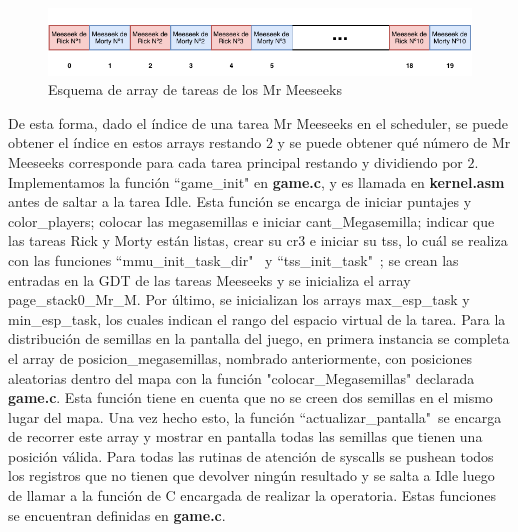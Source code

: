 \documentclass[a4paper]{article}
\begin{document}
\begin{figure}[h]
	\centering
	\includegraphics[scale=0.9]{img/TareasSinRickyMorty.pdf}
	\caption{Esquema de array de tareas de los Mr Meeseeks}
\end{figure}

\justify
De esta forma, dado el índice de una tarea Mr Meeseeks en el scheduler, se puede obtener el índice en estos arrays restando $2$ y se puede obtener qué número de Mr Meeseeks corresponde para cada tarea principal restando y dividiendo por $2$.
\justify
Implementamos la función ``game_init" en \textbf{game.c}, y es llamada en \textbf{kernel.asm} antes de saltar a la tarea Idle. Esta función se encarga de iniciar puntajes y color_players; colocar las megasemillas e iniciar cant_Megasemilla; indicar que las tareas Rick y Morty están listas, crear su cr3 e iniciar su tss, lo cuál se realiza con las funciones ``mmu_init_task_dir" \ y ``tss_init_task"\ ; se crean las entradas en la GDT de las tareas Meeseeks y se inicializa el array page_stack0_Mr_M. Por último, se inicializan los arrays max_esp_task y min_esp_task, los cuales indican el rango del espacio virtual de la tarea. 
\justify
Para la distribución de semillas en la pantalla del juego, en primera instancia se completa el array de posicion_megasemillas, nombrado anteriormente, con posiciones aleatorias dentro del mapa con la función "colocar_Megasemillas" declarada \textbf{game.c}. Esta función tiene en cuenta que no se creen dos semillas en el mismo lugar del mapa. Una vez hecho esto, la función ``actualizar_pantalla"\ se encarga de recorrer este array y mostrar en pantalla todas las semillas que tienen una posición válida.
\justify
Para todas las rutinas de atención de syscalls se pushean todos los registros que no tienen que devolver ningún resultado y se salta a Idle luego de llamar a la función de C encargada de realizar la operatoria. Estas funciones se encuentran definidas en \textbf{game.c}.
\justify
\end{document}
